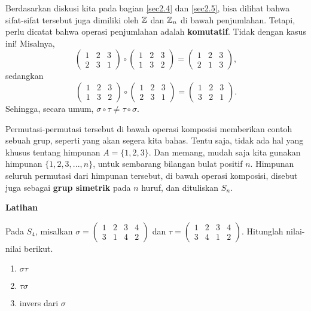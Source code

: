Berdasarkan diskusi kita pada bagian \ref{sec2.4} dan \ref{sec2.5}, bisa dilihat bahwa sifat-sifat tersebut juga dimiliki oleh $\mathbb{Z}$ dan $\mathbb{Z}_n$ di bawah penjumlahan. Tetapi, perlu dicatat bahwa operasi penjumlahan adalah \textbf{komutatif}. Tidak dengan kasus ini! Misalnya, 
\[ \begin{pmatrix}
1 & 2 & 3 \\
2 & 3 & 1
\end{pmatrix} \circ \begin{pmatrix}
1 & 2 & 3 \\
1 & 3 & 2
\end{pmatrix} = \begin{pmatrix}
1 & 2 & 3 \\
2 & 1 & 3
\end{pmatrix},
\]
sedangkan
\[\begin{pmatrix}
1 & 2 & 3 \\
1 & 3 & 2
\end{pmatrix} \circ \begin{pmatrix}
1 & 2 & 3 \\
2 & 3 & 1
\end{pmatrix} = \begin{pmatrix}
1 & 2 & 3 \\
3 & 2 & 1
\end{pmatrix}.
\]
Sehingga, secara umum, $\sigma \circ \tau \neq \tau \circ \sigma$.

Permutasi-permutasi tersebut di bawah operasi komposisi memberikan contoh sebuah grup, seperti yang akan segera kita bahas. Tentu saja, tidak ada hal yang khusus tentang himpunan $A = \{1, 2, 3 \}$. Dan memang, mudah saja kita gunakan himpunan $\{1, 2, 3, ..., n \}$, untuk sembarang bilangan bulat positif $n$. Himpunan seluruh permutasi dari himpunan tersebut, di bawah operasi komposisi, disebut juga sebagai \textbf{grup simetrik} pada $n$ huruf, dan dituliskan $S_n$.


\textbf{Latihan}

\begin{exc}
Pada $S_4$, misalkan $\sigma = \begin{pmatrix} 
1 & 2 & 3 & 4 \\
3 & 1 & 4 & 2
\end{pmatrix}$ dan $\tau =  \begin{pmatrix} 
1 & 2 & 3 & 4 \\
3 & 4 & 1 & 2
\end{pmatrix}$. Hitunglah nilai-nilai berikut.
  \begin{enumerate}
  	\item $\sigma \tau$
  	\item $\tau \sigma$
  	\item invers dari $\sigma$
  \end{enumerate}
\end{exc}

